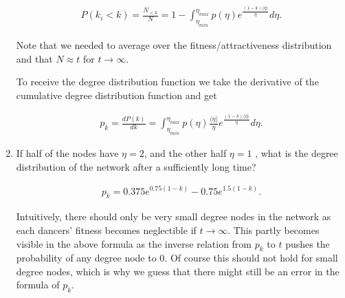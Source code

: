 \begin{enumerate}
	\begin{equation*}
		\begin{split}
			P(k_i < k) = \frac{N_{<k}}{N} = 1 - \int_{\eta_{min}}^{\eta_{max}} p(\eta) e^{\frac{(1 - k) \langle \eta \rangle}{\eta}} d\eta.
		\end{split}
	\end{equation*}
	
	Note that we needed to average over the fitness/attractiveness distribution and that $N \approx t$ for $t \rightarrow \infty$. 
	
	To receive the degree distribution function we take the derivative of the cumulative degree distribution function and get
	
	\begin{equation*}
		\begin{split}
			p_k = \frac{dP(k)}{dk} = \int_{\eta_{min}}^{\eta_{max}} p(\eta) \frac{\langle \eta \rangle}{\eta} e^{\frac{(1 - k) \langle \eta \rangle}{\eta}} d\eta.
		\end{split}
	\end{equation*}
	
	\item If half of the nodes have $\eta=2$, and the other half $\eta=1$ , what is the degree distribution of the network after a sufficiently long time?
	
	\begin{equation*}
		\begin{split}
			p_k = 0.375e^{0.75(1 - k)} - 0.75e^{1.5(1 - k)}.
		\end{split}
	\end{equation*}

	Intuitively, there should only be very small degree nodes in the network as each dancers' fitness becomes neglectible if $t \rightarrow \infty$. This partly becomes visible in the above formula as the inverse relation from $p_k$ to $t$ pushes the probability of any degree node to 0. Of course this should not hold for small degree nodes, which is why we guess that there might still be an error in the formula of $p_k$. 
	
\end{enumerate}